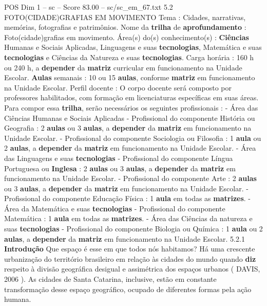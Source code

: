 \begin{textsample}{POS Dim 1 – sc – Score 83.00 – sc/sc\_em\_67.txt}  \label{ex:f1_pos_003}
5.2 FOTO(CIDADE)GRAFIAS EM MOVIMENTO Tema : Cidades, narrativas, memórias, fotografias e patrimônios.
Nome da \textbf{trilha} de \textbf{aprofundamento} : Foto(cidade)grafias em movimento.
Área(s) do(s) conhecimento(s) : \textbf{Ciências} Humanas e Sociais Aplicadas, Linguagens e suas \textbf{tecnologias}, Matemática e suas \textbf{tecnologias} e Ciências da Natureza e suas \textbf{tecnologias}.
Carga horária : 160 h ou 240 h, a \textbf{depender} da \textbf{matriz} curricular em funcionamento na Unidade Escolar. \textbf{Aulas} semanais : 10 ou 15 \textbf{aulas}, conforme \textbf{matriz} em funcionamento na Unidade Escolar.
Perfil docente : O corpo docente será composto por professores habilitados, com formação em licenciaturas específicas em suas áreas.
Para compor essa \textbf{trilha}, serão necessários os seguintes profissionais : - Área das Ciências Humanas e Sociais Aplicadas - Profissional do componente História ou Geografia : 2 \textbf{aulas} ou 3 \textbf{aulas}, a \textbf{depender} da \textbf{matriz} em funcionamento na Unidade Escolar. - Profissional do componente Sociologia ou Filosofia : 1 \textbf{aula} ou 2 \textbf{aulas}, a \textbf{depender} da \textbf{matriz} em funcionamento na Unidade Escolar. - Área das Linguagens e suas \textbf{tecnologias} - Profissional do componente Língua Portuguesa ou \textbf{Inglesa} : 2 \textbf{aulas} ou 3 \textbf{aulas}, a \textbf{depender} da \textbf{matriz} em funcionamento na Unidade Escolar. - Profissional do componente Arte : 2 \textbf{aulas} ou 3 \textbf{aulas}, a \textbf{depender} da \textbf{matriz} em funcionamento na Unidade Escolar. - Profissional do componente Educação Física : 1 \textbf{aula} em todas as \textbf{matrizes}. - Área da Matemática e suas \textbf{tecnologias} - Profissional do componente Matemática : 1 \textbf{aula} em todas as \textbf{matrizes}. - Área das Ciências da natureza e suas \textbf{tecnologias} - Profissional do componente Biologia ou Química : 1 \textbf{aula} ou 2 \textbf{aulas}, a \textbf{depender} da \textbf{matriz} em funcionamento na Unidade Escolar. 5.2.1 \textbf{Introdução} Que espaço é esse em que todos nós habitamos?
Há uma crescente urbanização do território brasileiro em relação às cidades do mundo quando \textbf{diz} respeito à divisão geográfica desigual e assimétrica dos espaços urbanos ( DAVIS, 2006 ).
As cidades de Santa Catarina, inclusive, estão em constante transformação desse espaço geográfico, ocupado de diferentes formas pela ação humana.

\end{textsample}
